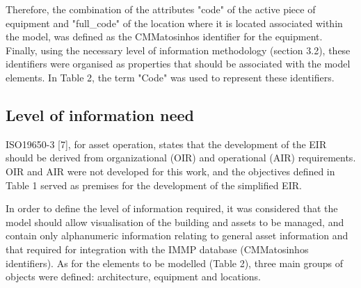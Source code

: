 \documentclass[a4paper, 10pt, twocolumn, twoside]{article}
\begin{document}
Therefore, the combination of the attributes "code" of the active piece of equipment and "full\_code" of the location where it is located associated within the model, was defined as the CMMatosinhos identifier for the equipment. Finally, using the necessary level of information methodology (section 3.2), these identifiers were organised as properties that should be associated with the model elements. In Table 2, the term "Code" was used to represent these identifiers.

\subsection{Level of information need}
\label{subsec:loin}

ISO19650-3 [7], for asset operation, states that the development of the EIR should be derived from organizational (OIR) and operational (AIR) requirements. OIR and AIR were not developed for this work, and the objectives defined in Table 1 served as premises for the development of the simplified EIR.

In order to define the level of information required, it was considered that the model should allow visualisation of the building and assets to be managed, and contain only alphanumeric information relating to general asset information and that required for integration with the IMMP database (CMMatosinhos identifiers). As for the elements to be modelled (Table 2), three main groups of objects were defined: architecture, equipment and locations.
\end{document}
